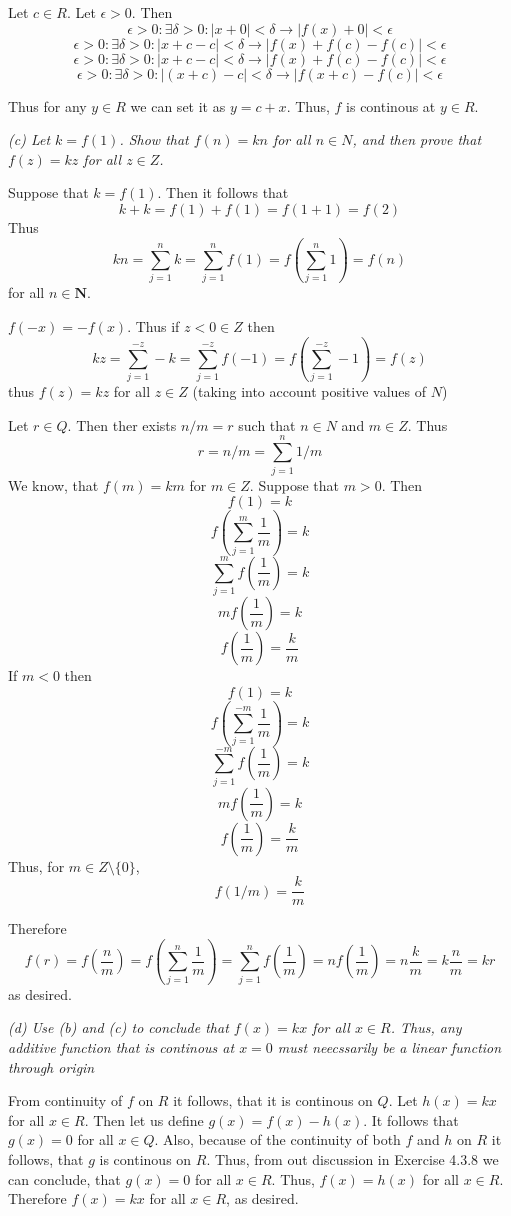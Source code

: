 \documentclass[11pt,oneside,titlepage]{book}
\begin{document}
Let $c \in R$. Let $\epsilon > 0$. Then
$$\epsilon > 0: \exists \delta > 0: |x + 0| < \delta \to |f(x) + 0| < \epsilon$$
$$\epsilon > 0: \exists \delta > 0: |x + c - c| < \delta \to |f(x) + f(c) - f(c)| < \epsilon$$
$$\epsilon > 0: \exists \delta > 0: |x + c - c| < \delta \to |f(x) + f(c) - f(c)| < \epsilon$$
$$\epsilon > 0: \exists \delta > 0: |(x + c) - c| < \delta \to |f(x + c) - f(c)| < \epsilon$$


Thus for any $y \in R$ we can set it as $y = c + x$. Thus, $f$ is continous
at $y \in R$.

\textit{(c) Let $k = f(1)$. Show that $f(n) = kn$ for all $n \in N$, and
  then prove that $f(z) = kz$ for all $z \in Z$. }

Suppose that $k = f(1)$. Then it follows that
$$k + k = f(1) + f(1) = f(1 + 1) = f(2)$$
Thus
$$kn = \sum_{j = 1}^{n} k = \sum_{j = 1}^{n} f(1) =
f\left(\sum_{j = 1}^{n} 1\right) = f(n)$$
for all $n \in \textbf{N}$.

$f(-x) = -f(x)$. Thus if $z < 0 \in Z$ then
$$kz = \sum_{j = 1}^{-z} -k = \sum_{j = 1}^{-z} f(-1) =
f\left(\sum_{j = 1}^{-z} -1\right) = f(z)$$
thus $f(z) = kz$ for all $z \in Z$ (taking into account positive values of $N$)

Let $r \in Q$. Then ther exists $n/m = r$ such that $n \in N$ and $m \in Z$.
Thus
$$r = n/m = \sum_{j = 1}^{n} 1/m$$
We know, that $f(m) = km$ for $m \in Z$. Suppose that $m > 0$. Then
$$f(1) = k$$
$$f\left(\sum_{j = 1}^m \frac{1}{m}\right) = k$$
$$\sum_{j = 1}^m f\left(\frac{1}{m}\right) = k$$
$$mf\left(\frac{1}{m}\right) = k$$
$$f\left(\frac{1}{m}\right) = \frac{k}{m}$$
If $m < 0$ then
$$f(1) = k$$
$$f\left(\sum_{j = 1}^{-m} \frac{1}{m}\right) = k$$
$$\sum_{j = 1}^{-m} f\left(\frac{1}{m}\right) = k$$
$$mf\left(\frac{1}{m}\right) = k$$
$$f\left(\frac{1}{m}\right) = \frac{k}{m}$$
Thus, for $m \in Z \setminus \{0\}$,
$$f(1/m) = \frac{k}{m}$$

Therefore
$$f(r) = f\left(\frac{n}{m}\right) = f\left(\sum_{j = 1}^n\frac{1}{m}\right) =
\sum_{j = 1}^nf\left(\frac{1}{m}\right) = n f\left(\frac{1}{m}\right) =
n \frac{k}{m} = k \frac{n}{m} = kr$$
as desired.

\textit{(d) Use (b) and (c) to conclude that $f(x) = kx$ for all $x \in R$.
  Thus, any additive function that is continous at $x = 0$ must neecssarily
  be a linear function through origin}

From continuity of $f$ on $R$ it follows, that it is continous on $Q$.
Let $h(x) = kx$ for all $x \in R$. 
Then let us define  $g(x) = f(x) - h(x)$. It follows that $g(x) = 0$ for all
$x \in Q$. Also, because of the continuity of both $f$ and $h$ on $R$ it
follows, that $g$ is continous on $R$.
Thus, from out discussion in Exercise 4.3.8 we can conclude,
that $g(x) = 0$ for all $x \in R$. Thus, $f(x) = h(x)$ for all $x \in R$.
Therefore $f(x) = kx$ for all $x \in R$, as desired.
\end{document}
